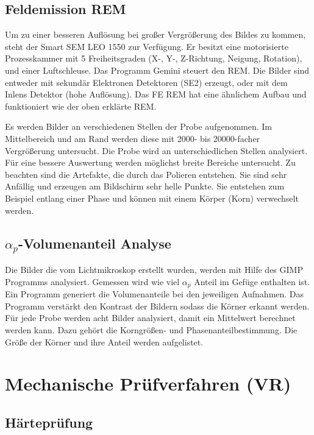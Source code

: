 \subsection{Feldemission REM}
Um zu einer besseren Auflösung bei großer Vergrößerung des Bildes zu kommen, steht der Smart SEM LEO 1550 zur Verfügung. Er besitzt eine motorisierte Prozesskammer mit 5 Freiheitsgraden (X-, Y-, Z-Richtung, Neigung, Rotation), und einer Luftschleuse. Das Programm Gemini steuert den REM. Die Bilder sind entweder mit sekundär Elektronen Detektoren (SE2) erzeugt, oder mit dem Inlens Detektor (hohe Auflösung). Das FE REM hat eine ähnlichem Aufbau und funktioniert wie der oben erklärte REM.

Es werden Bilder an verschiedenen Stellen der Probe aufgenommen. Im Mittelbereich und am Rand werden diese mit 2000- bis 20000-facher Vergrößerung untersucht. Die Probe wird an unterschiedlichen Stellen analysiert. Für eine bessere Auswertung werden möglichst breite Bereiche untersucht. Zu beachten sind die Artefakte, die durch das Polieren entstehen. Sie sind sehr Anfällig und erzeugen am Bildschirm sehr helle Punkte. Sie entstehen zum Beispiel entlang einer Phase und können mit einem Körper (Korn) verwechselt werden.

\subsection{$\alpha_{p}$-Volumenanteil Analyse}

Die Bilder die vom Lichtmikroskop erstellt wurden, werden mit Hilfe des GIMP Programms analysiert. Gemessen wird wie viel $\alpha_{p}$ Anteil im Gefüge enthalten ist. Ein Programm generiert die Volumenanteile bei den jeweiligen Aufnahmen. Das Programm verstärkt den Kontrast der Bildern sodass die Körner erkannt werden. Für jede Probe werden acht Bilder analysiert, damit ein Mittelwert berechnet werden kann. Dazu gehört die Korngrößen- und Phasenanteilbestimmung. Die Größe der Körner und ihre Anteil werden aufgelistet. 

\section{Mechanische Prüfverfahren (VR)}

\subsection{Härteprüfung}

